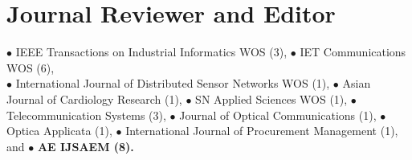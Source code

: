 \vspace{-2.5em}
\section{Journal Reviewer and Editor}
$\bullet$ IEEE Transactions on Industrial Informatics WOS (3), $\bullet$ IET Communications WOS (6),\\ $\bullet$ International Journal of Distributed Sensor Networks WOS (1), $\bullet$ Asian Journal of Cardiology Research (1), $\bullet$ SN Applied Sciences WOS (1), $\bullet$ Telecommunication Systems (3), $\bullet$ Journal of Optical Communications  (1), $\bullet$ Optica Applicata  (1), $\bullet$ International Journal of Procurement Management (1), and $\bullet$ \bf{AE} IJSAEM (8).\\
\vspace{-1em}
\sectionline
